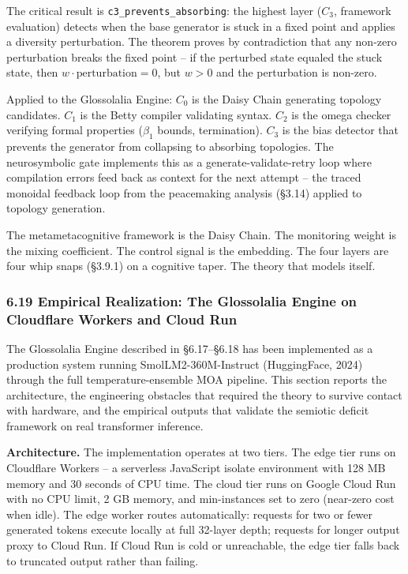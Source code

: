 \documentclass[
  11pt,
]{article}
\begin{document}
The critical result is \texttt{c3\_prevents\_absorbing}: the highest
layer (\(C_3\), framework evaluation) detects when the base generator is
stuck in a fixed point and applies a diversity perturbation. The theorem
proves by contradiction that any non-zero perturbation breaks the fixed
point -- if the perturbed state equaled the stuck state, then
\(w \cdot \text{perturbation} = 0\), but \(w > 0\) and the perturbation
is non-zero.

Applied to the Glossolalia Engine: \(C_0\) is the Daisy Chain generating
topology candidates. \(C_1\) is the Betty compiler validating syntax.
\(C_2\) is the omega checker verifying formal properties (\(\beta_1\)
bounds, termination). \(C_3\) is the bias detector that prevents the
generator from collapsing to absorbing topologies. The neurosymbolic
gate implements this as a generate-validate-retry loop where compilation
errors feed back as context for the next attempt -- the traced monoidal
feedback loop from the peacemaking analysis (§3.14) applied to topology
generation.

The metametacognitive framework is the Daisy Chain. The monitoring
weight is the mixing coefficient. The control signal is the embedding.
The four layers are four whip snaps (§3.9.1) on a cognitive taper. The
theory that models itself.

\subsubsection{6.19 Empirical Realization: The Glossolalia Engine on
Cloudflare Workers and Cloud
Run}\label{empirical-realization-the-glossolalia-engine-on-cloudflare-workers-and-cloud-run}

The Glossolalia Engine described in §6.17--§6.18 has been implemented as
a production system running SmolLM2-360M-Instruct (HuggingFace, 2024)
through the full temperature-ensemble MOA pipeline. This section reports
the architecture, the engineering obstacles that required the theory to
survive contact with hardware, and the empirical outputs that validate
the semiotic deficit framework on real transformer inference.

\textbf{Architecture.} The implementation operates at two tiers. The
edge tier runs on Cloudflare Workers -- a serverless JavaScript isolate
environment with 128 MB memory and 30 seconds of CPU time. The cloud
tier runs on Google Cloud Run with no CPU limit, 2 GB memory, and
min-instances set to zero (near-zero cost when idle). The edge worker
routes automatically: requests for two or fewer generated tokens execute
locally at full 32-layer depth; requests for longer output proxy to
Cloud Run. If Cloud Run is cold or unreachable, the edge tier falls back
to truncated output rather than failing.
\end{document}
